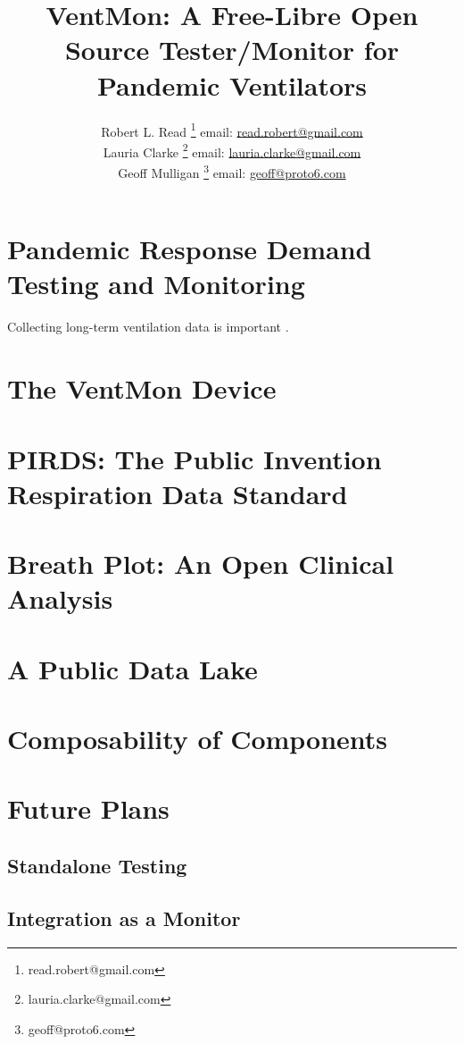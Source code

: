 \documentclass{article}
\title{VentMon: A Free-Libre Open Source Tester/Monitor for Pandemic Ventilators}
\author{Robert L. Read
  \thanks{read.robert@gmail.com}
  email: \href{mailto:read.robert@gmail.com}{read.robert@gmail.com}\\
Lauria Clarke
  \thanks{lauria.clarke@gmail.com}
  email: \href{mailto:lauria.clarke@gmail.com}{lauria.clarke@gmail.com}\\
  Geoff Mulligan
  \thanks{geoff@proto6.com }
  email: \href{mailto:geoff@proto6.com }{geoff@proto6.com}
  }
\begin{document}
\maketitle
\begin{abstract}

\end{abstract}


\section{Pandemic Response Demand Testing and Monitoring}

Collecting long-term ventilation data is important
\cite{rehm2018development}.

\section{The VentMon Device}

\section{PIRDS: The Public Invention Respiration Data Standard}

\section{Breath Plot: An Open Clinical Analysis}

\section{A Public Data Lake}

\section{Composability of Components}

\section{Future Plans}

\subsection{Standalone Testing}

\subsection{Integration as a Monitor}
\end{document}
